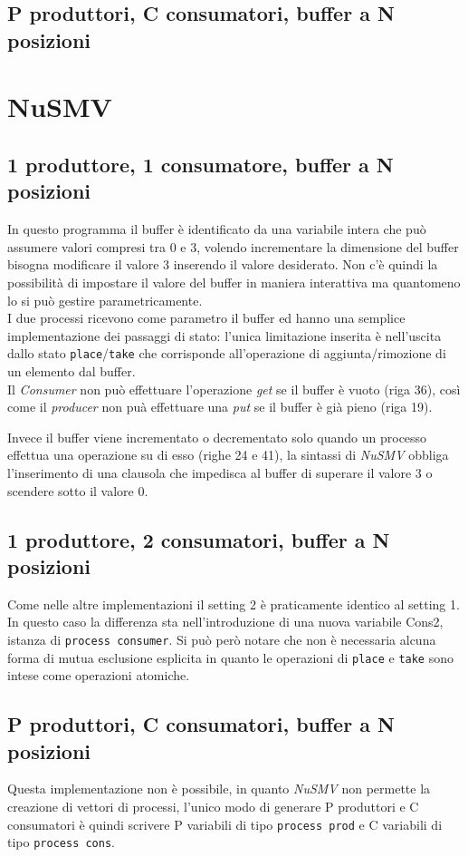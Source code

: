 \documentclass[a4paper]{article}
\begin{document}
\subsection{P produttori, C consumatori, buffer a N posizioni}
\section{NuSMV}
\subsection{1 produttore, 1 consumatore, buffer a N posizioni}

In questo programma il buffer è identificato da una variabile intera che può assumere valori compresi tra 0 e 3, volendo incrementare la dimensione del buffer bisogna modificare il valore 3 inserendo il valore desiderato.
Non c'è quindi la possibilità di impostare il valore del buffer in maniera interattiva ma quantomeno lo si può gestire parametricamente.\\
I due processi ricevono come parametro il buffer ed hanno una semplice implementazione dei passaggi di stato: l'unica limitazione inserita è nell'uscita dallo stato \texttt{place}/\texttt{take} che corrisponde all'operazione di aggiunta/rimozione di un elemento dal buffer.\\
Il \textit{Consumer} non può effettuare l'operazione \textit{get} se il buffer è vuoto (riga 36), così come il \textit{producer} non puà effettuare una \textit{put} se il buffer è già pieno (riga 19).

Invece il buffer viene incrementato o decrementato solo quando un processo effettua una operazione su di esso (righe 24 e 41), la sintassi di \textit{NuSMV} obbliga l'inserimento di una clausola che impedisca al buffer di superare il valore 3 o scendere sotto il valore 0.

\subsection{1 produttore, 2 consumatori, buffer a N posizioni}

Come nelle altre implementazioni il setting 2 è praticamente identico al setting 1. In questo caso la differenza sta nell'introduzione di una nuova variabile Cons2, istanza di \texttt{process consumer}.
Si può però notare che non è necessaria alcuna forma di mutua esclusione esplicita in quanto le operazioni di \texttt{place} e \texttt{take} sono intese come operazioni atomiche.
\subsection{P produttori, C consumatori, buffer a N posizioni}
Questa implementazione non è possibile, in quanto \emph{NuSMV} non permette la creazione di vettori di processi, l'unico modo di generare P produttori e C consumatori è quindi scrivere P variabili di tipo \texttt{process prod} e C variabili di tipo \texttt{process cons}.
\end{document}
